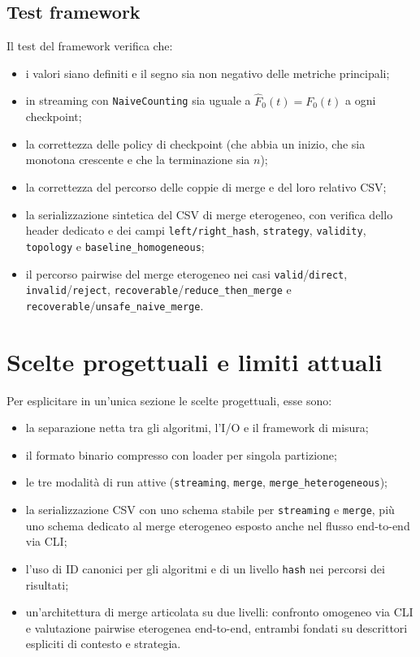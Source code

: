 \subsection{Test framework}

Il test del framework  verifica che:
\begin{itemize}
    \item i valori siano definiti e il segno sia non negativo delle metriche principali;
    \item in streaming con \texttt{NaiveCounting} sia uguale a
    \(\hat{F}_0(t)=F_0(t)\) a ogni checkpoint;
    \item la correttezza delle policy di checkpoint (che abbia un inizio, che sia monotona crescente e che la terminazione sia \(n\));
    \item la correttezza del percorso delle coppie di merge e del loro relativo CSV;
    \item la serializzazione sintetica del CSV di merge eterogeneo, con verifica
    dello header dedicato e dei campi \texttt{left/right\_hash},
    \texttt{strategy}, \texttt{validity}, \texttt{topology} e
    \texttt{baseline\_homogeneous};
    \item il percorso pairwise del merge eterogeneo nei casi
    \texttt{valid}/\texttt{direct}, \texttt{invalid}/\texttt{reject},
    \texttt{recoverable}/\texttt{reduce\_then\_merge} e
    \texttt{recoverable}/\texttt{unsafe\_naive\_merge}.
\end{itemize}

\section{Scelte progettuali e limiti attuali}
Per esplicitare in un'unica sezione le scelte progettuali, esse sono:
	\begin{itemize}
	    \item la separazione netta tra gli algoritmi, l'I/O e il framework di misura;
	    \item il formato binario compresso con loader per singola partizione;
	    \item le tre modalità di run attive (\texttt{streaming}, \texttt{merge}, \texttt{merge\_heterogeneous});
	    \item la serializzazione CSV con uno schema stabile per \texttt{streaming} e
	    \texttt{merge}, più uno schema dedicato al merge eterogeneo esposto anche
	    nel flusso end-to-end via CLI;
	    \item l'uso di ID canonici per gli algoritmi e di un livello \texttt{hash} nei percorsi dei risultati;
	    \item un'architettura di merge articolata su due livelli: confronto omogeneo
	    via CLI e valutazione pairwise eterogenea end-to-end, entrambi fondati su
	    descrittori espliciti di contesto e strategia.
	\end{itemize}

